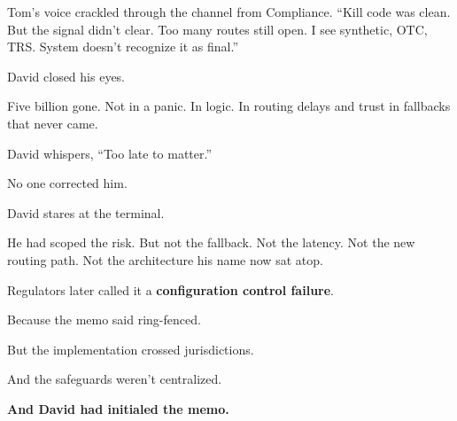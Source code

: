 Tom’s voice crackled through the channel from Compliance. “Kill code was clean. But the signal didn’t clear.  
Too many routes still open. I see synthetic, OTC, TRS. System doesn't recognize it as final.”

David closed his eyes.

Five billion gone. Not in a panic. In logic. In routing delays and trust in fallbacks that never came.

David whispers, “Too late to matter.”

No one corrected him.

David stares at the terminal.

He had scoped the risk.  
But not the fallback.
Not the latency.
Not the new routing path.
Not the architecture his name now sat atop.

Regulators later called it a \textbf{configuration control failure}.

Because the memo said ring-fenced.

But the implementation crossed jurisdictions.

And the safeguards weren’t centralized.

\textbf{And David had initialed the memo.}

\medskip

